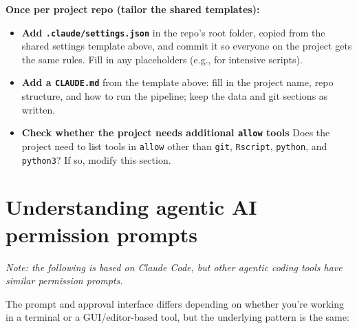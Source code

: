 \documentclass[
]{book}
\begin{document}
\textbf{Once per project repo (tailor the shared templates):}

\begin{itemize}
\item[$\square$]
  \textbf{Add \texttt{.claude/settings.json}} in the repo's root folder, copied
  from the shared settings template above, and commit it so everyone
  on the project gets the same rules. Fill in any placeholders (e.g., for intensive scripts).
\item[$\square$]
  \textbf{Add a \texttt{CLAUDE.md}} from the template above: fill in the
  project name, repo structure, and how to run the pipeline; keep the
  data and git sections as written.
\item[$\square$]
  \textbf{Check whether the project needs additional \texttt{allow} tools} Does
  the project need to list tools in \texttt{allow} other than \texttt{git}, \texttt{Rscript},
  \texttt{python}, and \texttt{python3}? If so, modify this section.
\end{itemize}

\section{Understanding agentic AI permission prompts}\label{understanding-agentic-ai-permission-prompts}

\emph{Note: the following is based on Claude Code, but other agentic coding
tools have similar permission prompts.}

The prompt and approval interface differs depending on whether you're
working in a terminal or a GUI/editor-based tool, but the underlying
pattern is the same:
\end{document}
